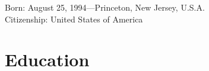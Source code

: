 \documentclass[10pt, letterpaper]{article}
\begin{document}


Born:  August 25, 1994---Princeton, New Jersey, U.S.A.\\
Citizenship:  United States of America



\section*{Education}
\end{document}
